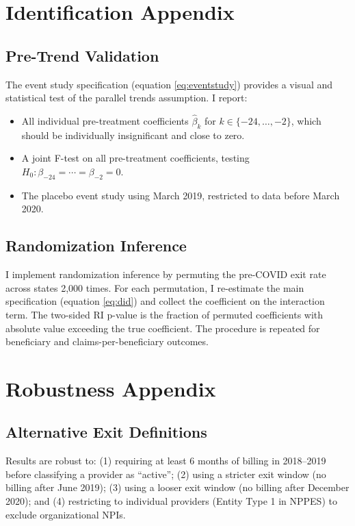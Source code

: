 \documentclass[12pt]{article}
\begin{document}
\section{Identification Appendix}

\subsection{Pre-Trend Validation}

The event study specification (equation \ref{eq:eventstudy}) provides a visual and statistical test of the parallel trends assumption. I report:
\begin{itemize}
\item All individual pre-treatment coefficients $\hat{\beta}_k$ for $k \in \{-24, \ldots, -2\}$, which should be individually insignificant and close to zero.
\item A joint F-test on all pre-treatment coefficients, testing $H_0: \beta_{-24} = \cdots = \beta_{-2} = 0$.
\item The placebo event study using March 2019, restricted to data before March 2020.
\end{itemize}

\subsection{Randomization Inference}

I implement randomization inference by permuting the pre-COVID exit rate across states 2,000 times. For each permutation, I re-estimate the main specification (equation \ref{eq:did}) and collect the coefficient on the interaction term. The two-sided RI p-value is the fraction of permuted coefficients with absolute value exceeding the true coefficient. The procedure is repeated for beneficiary and claims-per-beneficiary outcomes.

\section{Robustness Appendix}

\subsection{Alternative Exit Definitions}

Results are robust to: (1) requiring at least 6 months of billing in 2018--2019 before classifying a provider as ``active''; (2) using a stricter exit window (no billing after June 2019); (3) using a looser exit window (no billing after December 2020); and (4) restricting to individual providers (Entity Type 1 in NPPES) to exclude organizational NPIs.
\end{document}
